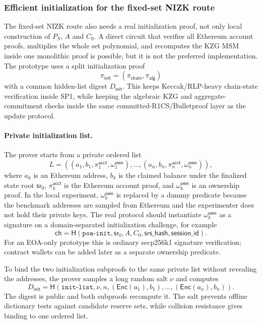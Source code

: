 \documentclass[UTF8,a4paper,11pt]{ctexart}
\newcommand{\Hash}{\mathsf H}
\newcommand{\Enc}{\mathsf{Enc}}
\newcommand{\sr}{\mathsf{sr}}
\begin{document}
\subsubsection{Efficient initialization for the fixed-set NIZK route}

The fixed-set NIZK route also needs a real initialization proof, not only local construction of
$P_S$, $A$ and $C_0$.  A direct circuit that verifies all Ethereum account proofs, multiplies the
whole set polynomial, and recomputes the KZG MSM inside one monolithic proof is possible, but it is
not the preferred implementation.  The prototype uses a split initialization proof
\[
  \pi_{\mathsf{init}}=(\pi_{\mathsf{chain}},\pi_{\mathsf{alg}})
\]
with a common hidden-list digest $D_{\mathsf{init}}$.  This keeps Keccak/RLP-heavy chain-state
verification inside SP1, while keeping the algebraic KZG and aggregate-commitment checks inside the
same committed-R1CS/Bulletproof layer as the update protocol.

\paragraph{Private initialization list.}
The prover starts from a private ordered list
\[
  L=((a_1,b_1,\pi^{\mathsf{acct}}_1,\omega^{\mathsf{own}}_1),\ldots,
     (a_n,b_n,\pi^{\mathsf{acct}}_n,\omega^{\mathsf{own}}_n)),
\]
where $a_k$ is an Ethereum address, $b_k$ is the claimed balance under the finalized state root
$\sr_0$, $\pi^{\mathsf{acct}}_k$ is the Ethereum account proof, and $\omega^{\mathsf{own}}_k$ is an
ownership proof.  In the local experiment, $\omega^{\mathsf{own}}_k$ is replaced by a dummy predicate
because the benchmark addresses are sampled from Ethereum and the experimenter does not hold their
private keys.  The real protocol should instantiate $\omega^{\mathsf{own}}_k$ as a signature on a
domain-separated initialization challenge, for example
\[
  \mathsf{ch}=\Hash(\mathtt{poa\mbox{-}init},\sr_0,A,C_0,\mathsf{srs\_hash},\mathsf{session\_id}).
\]
For an EOA-only prototype this is ordinary secp256k1 signature verification; contract wallets can be
added later as a separate ownership predicate.

To bind the two initialization subproofs to the same private list without revealing the addresses,
the prover samples a long random salt $\nu$ and computes
\[
  D_{\mathsf{init}}=\Hash(\mathtt{init\mbox{-}list},\nu,n,
      (\Enc(a_1),b_1),\ldots,(\Enc(a_n),b_n)).
\]
The digest is public and both subproofs recompute it.  The salt prevents offline dictionary tests
against candidate reserve sets, while collision resistance gives binding to one ordered list.
\end{document}
